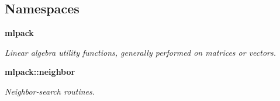 \subsection*{Namespaces}
\begin{DoxyCompactItemize}
\item 
 {\bf mlpack}
\begin{DoxyCompactList}\small\item\em Linear algebra utility functions, generally performed on matrices or vectors. \end{DoxyCompactList}\item 
 {\bf mlpack\+::neighbor}
\begin{DoxyCompactList}\small\item\em Neighbor-\/search routines. \end{DoxyCompactList}\end{DoxyCompactItemize}
